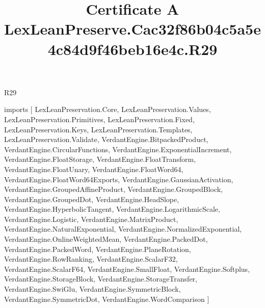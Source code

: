 \begin{lexlean}{R29}
\title{Certificate A LexLeanPreserve.Cac32f86b04c5a5e4c84d9f46beb16e4c.R29}
\begin{coremodule}
imports [
  LexLeanPreservation.Core,
  LexLeanPreservation.Values,
  LexLeanPreservation.Primitives,
  LexLeanPreservation.Fixed,
  LexLeanPreservation.Keys,
  LexLeanPreservation.Templates,
  LexLeanPreservation.Validate,
  VerdantEngine.BitpackedProduct,
  VerdantEngine.CircularFunctions,
  VerdantEngine.ExponentialIncrement,
  VerdantEngine.FloatStorage,
  VerdantEngine.FloatTransform,
  VerdantEngine.FloatUnary,
  VerdantEngine.FloatWord64,
  VerdantEngine.FloatWord64Exports,
  VerdantEngine.GaussianActivation,
  VerdantEngine.GroupedAffineProduct,
  VerdantEngine.GroupedBlock,
  VerdantEngine.GroupedDot,
  VerdantEngine.HeadSlope,
  VerdantEngine.HyperbolicTangent,
  VerdantEngine.LogarithmicScale,
  VerdantEngine.Logistic,
  VerdantEngine.MatrixProduct,
  VerdantEngine.NaturalExponential,
  VerdantEngine.NormalizedExponential,
  VerdantEngine.OnlineWeightedMean,
  VerdantEngine.PackedDot,
  VerdantEngine.PackedWord,
  VerdantEngine.PlaneRotation,
  VerdantEngine.RowRanking,
  VerdantEngine.ScalarF32,
  VerdantEngine.ScalarF64,
  VerdantEngine.SmallFloat,
  VerdantEngine.Softplus,
  VerdantEngine.StorageBlock,
  VerdantEngine.StorageTransfer,
  VerdantEngine.SwiGlu,
  VerdantEngine.SymmetricBlock,
  VerdantEngine.SymmetricDot,
  VerdantEngine.WordComparison
]


\end{coremodule}
\end{lexlean}
